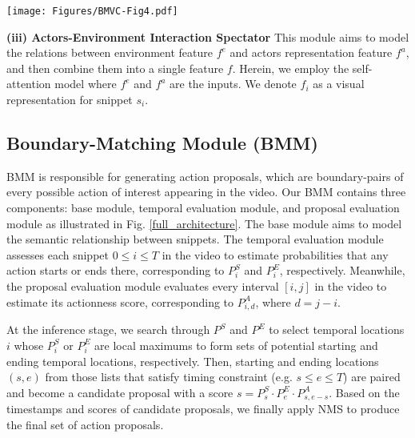 \documentclass{bmvc2k}
\begin{document}
\begin{figure*}[t]
\centering
  \texttt{[image: Figures/BMVC-Fig4.pdf]}
  \vspace*{-0.1cm}
  \caption{The overall architecture of our proposed AEI, consisting of perception-based visual representation module (PVR), and boundary-matching module (BMM). }
  \vspace*{-0.4cm}
  \label{full_architecture}
\end{figure*}






\vspace{0.2cm}
\textbf{(iii) Actors-Environment Interaction Spectator}
This module aims to model the relations between environment feature $f^e$ and actors representation feature $f^a$, and then combine them into a single feature $f$. Herein, we employ the self-attention model \cite{attention_is_all_you_need} where $f^e$ and $f^a$ are the inputs. We denote $f_i$ as a visual representation for snippet $s_i$.





\subsection{Boundary-Matching Module (BMM)}
\label{subsec:bmm}

BMM is responsible for generating action proposals, which are boundary-pairs of every possible action of interest appearing in the video. Our BMM contains three components: base module, temporal evaluation module, and proposal evaluation module as illustrated in Fig. \ref{full_architecture}. The base module aims to model the semantic relationship between snippets. The temporal evaluation module assesses each snippet $0\leq i \leq T$ in the video to estimate probabilities that any action starts or ends there, corresponding to $P^S_i$ and $P^E_i$, respectively. Meanwhile, the proposal evaluation module evaluates every interval $[i,j]$ in the video to estimate its actionness score, corresponding to $P^A_{i,d}$, where $d=j-i$.














At the inference stage, we search through $P^S$ and $P^E$ to select temporal locations $i$ whose $P^S_i$ or $P^E_i$ are local maximums to form sets of potential starting and ending temporal locations, respectively. Then, starting and ending locations $(s, e)$ from those lists that satisfy timing constraint (e.g. $s\leq e \leq T$) are paired and become a candidate proposal with a score $s=P^S_s \cdot P^E_e \cdot P^A_{s, e-s}$. 
Based on the timestamps and scores of candidate proposals, we finally apply NMS \cite{SoftNMS, NMS} to produce the final set of action proposals.
\end{document}
